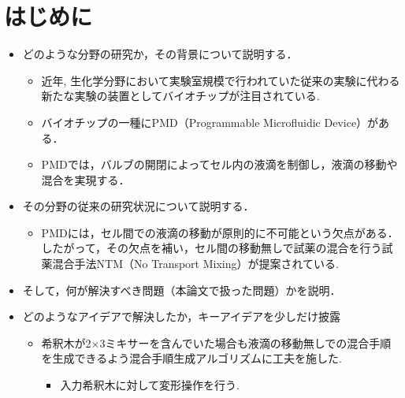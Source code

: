 \chapter{はじめに}
\begin{itemize}
 
 \setlength{\parskip}{0cm} %
 \setlength{\itemsep}{0cm} %
 \item どのような分野の研究か，その背景について説明する．
     \begin{itemize}
        \item 近年, 生化学分野において実験室規模で行われていた従来の実験に代わる新たな実験の装置としてバイオチップが注目されている.
        \item バイオチップの一種にPMD（Programmable Microfluidic Device）がある．
        \item PMDでは，バルブの開閉によってセル内の液滴を制御し，液滴の移動や混合を実現する．
    \end{itemize}
 \item その分野の従来の研究状況について説明する．
     \begin{itemize}
        \item PMDには，セル間での液滴の移動が原則的に不可能という欠点がある．したがって，その欠点を補い，セル間の移動無しで試薬の混合を行う試薬混合手法NTM（No Transport Mixing）が提案されている.
    \end{itemize}
 \item そして，何が解決すべき問題（本論文で扱った問題）かを説明．
 \item どのようなアイデアで解決したか，キーアイデアを少しだけ披露
     \begin{itemize}
         \item {希釈木が2×3ミキサーを含んでいた場合も液滴の移動無しでの混合手順を生成できるよう混合手順生成アルゴリズムに工夫を施した.
            \begin{itemize}
                    \item 入力希釈木に対して変形操作を行う.

\end{itemize}}
\end{itemize}
\end{itemize}
